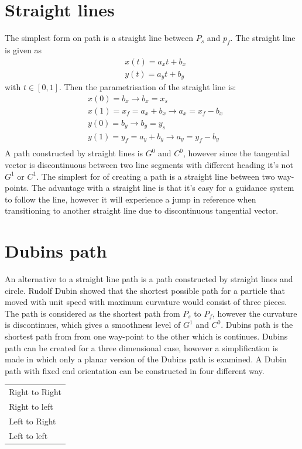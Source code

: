 \section{Straight lines}
The simplest form on path is a straight line between $P_s$ and $p_f$. The straight line is given as 
\begin{subequations}
\begin{align}
& x(t) = a_xt + b_x \\
& y(t) = a_yt + b_y 
\end{align}
\end{subequations}
with $ t \in [0,1] $. Then the parametrisation of the straight line is:
\begin{subequations}
\begin{align}
& x(0) = b_x \rightarrow b_x = x_s \\
& x(1) = x_f = a_x + b_x \rightarrow a_x = x_f - b_x \\
& y(0) = b_y \rightarrow b_y = y_s \\
& y(1) = y_f = a_y + b_y \rightarrow a_y = y_f - b_y \\
\end{align}
\end{subequations}
A path constructed by straight lines is $G^0$ and $C^0$, however since the tangential vector is discontinuous between two line segments with different heading it's not $G^1$ or $C^1$.
The simplest for of creating a path is a straight line between two way-points. The advantage with a straight line is that it's easy for a guidance system to follow the line, however it will experience a jump in reference when transitioning to another straight line due to discontinuous tangential vector.
\section{Dubins path}
An alternative to a straight line path is a path constructed by straight lines and circle. Rudolf Dubin showed \citep{dubins1957curves} that the shortest possible path for a particle that moved with unit speed with maximum curvature would consist of three pieces. The path is considered as the shortest path from $P_s$ to $P_f$, however the curvature is discontinues, which gives a smoothness level of $G^1$ and $C^0$. 
Dubins path is the shortest path from from one way-point to the other which is continues. Dubins path can be created for a three dimensional case, however a simplification is made in which only a planar version of the Dubins path is examined. A Dubin path with fixed end orientation can be constructed in four different way.
\begin{table}[H]
\centering
\begin{adjustbox}{max width=\textwidth}
\begin{tabular}{ | l |}
\hline
Right to Right \\
Right to left \\
Left to Right \\
Left to left \\ \hline
\end{tabular}
\end{adjustbox}
\end{table}

